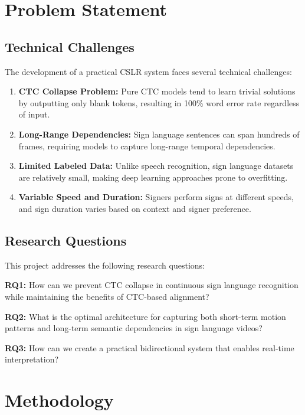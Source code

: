 \documentclass[12pt,a4paper]{article}
\begin{document}
\section{Problem Statement}

\subsection{Technical Challenges}

The development of a practical CSLR system faces several technical challenges:

\begin{enumerate}[noitemsep]
    \item \textbf{CTC Collapse Problem:} Pure CTC models tend to learn trivial solutions by outputting only blank tokens, resulting in 100\% word error rate regardless of input.
    
    \item \textbf{Long-Range Dependencies:} Sign language sentences can span hundreds of frames, requiring models to capture long-range temporal dependencies.
    
    \item \textbf{Limited Labeled Data:} Unlike speech recognition, sign language datasets are relatively small, making deep learning approaches prone to overfitting.
    
    \item \textbf{Variable Speed and Duration:} Signers perform signs at different speeds, and sign duration varies based on context and signer preference.
\end{enumerate}

\subsection{Research Questions}

This project addresses the following research questions:

\textbf{RQ1:} How can we prevent CTC collapse in continuous sign language recognition while maintaining the benefits of CTC-based alignment?

\textbf{RQ2:} What is the optimal architecture for capturing both short-term motion patterns and long-term semantic dependencies in sign language videos?

\textbf{RQ3:} How can we create a practical bidirectional system that enables real-time interpretation?

\section{Methodology}
\end{document}
